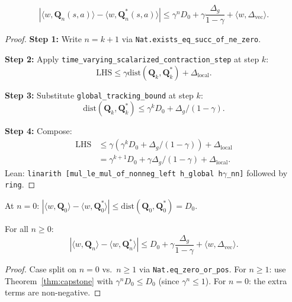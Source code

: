 \begin{theorem}
\label{thm:capstone}
\begin{equation}
    |\langle w, \mathbf{Q}_n(s,a) \rangle - \langle w, \mathbf{Q}^*_n(s,a) \rangle| \le \gamma^n D_0 + \gamma \frac{\Delta_g}{1{-}\gamma} + \langle w, \Delta_{\mathrm{vec}} \rangle.
\end{equation}
\end{theorem}
\begin{proof}
\textbf{Step 1:} Write $n = k+1$ via \texttt{Nat.exists\_eq\_succ\_of\_ne\_zero}.

\textbf{Step 2:} Apply \texttt{time\_varying\_scalarized\_contraction\_step} at step $k$:
\begin{equation}
    \text{LHS} \le \gamma \mathrm{dist}(\mathbf{Q}_k, \mathbf{Q}^*_k) + \Delta_{\mathrm{local}}.
\end{equation}

\textbf{Step 3:} Substitute \texttt{global\_tracking\_bound} at step $k$:
\begin{equation}
    \mathrm{dist}(\mathbf{Q}_k, \mathbf{Q}^*_k) \le \gamma^k D_0 + \Delta_g/(1{-}\gamma).
\end{equation}

\textbf{Step 4:} Compose:
\begin{align}
    \text{LHS} &\le \gamma(\gamma^k D_0 + \Delta_g/(1{-}\gamma)) + \Delta_{\mathrm{local}} \\
    &= \gamma^{k+1} D_0 + \gamma \Delta_g/(1{-}\gamma) + \Delta_{\mathrm{local}}.
\end{align}
Lean: \texttt{linarith [mul\_le\_mul\_of\_nonneg\_left h\_global h$\gamma$\_nn]} followed by \texttt{ring}.
\end{proof}

\begin{corollary}
At $n = 0$: $|\langle w, \mathbf{Q}_0 \rangle - \langle w, \mathbf{Q}^*_0 \rangle| \le \mathrm{dist}(\mathbf{Q}_0, \mathbf{Q}^*_0) = D_0$.
\end{corollary}

\begin{theorem}
For all $n \ge 0$:
\begin{equation}
    |\langle w, \mathbf{Q}_n \rangle - \langle w, \mathbf{Q}^*_n \rangle| \le D_0 + \gamma \frac{\Delta_g}{1{-}\gamma} + \langle w, \Delta_{\mathrm{vec}} \rangle.
\end{equation}
\end{theorem}
\begin{proof}
Case split on $n = 0$ vs.\ $n \ge 1$ via \texttt{Nat.eq\_zero\_or\_pos}.  For $n \ge 1$: use Theorem~\ref{thm:capstone} with $\gamma^n D_0 \le D_0$ (since $\gamma^n \le 1$).  For $n = 0$: the extra terms are non-negative.
\end{proof}

